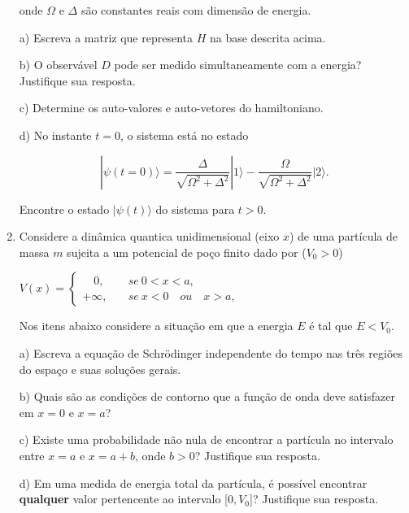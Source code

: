 \begin{enumerate}[start=1,label={\bfseries Q\arabic*.}]
onde $\Omega$ e $\Delta$ são constantes reais com dimensão de energia.


a) Escreva a matriz que representa $H$ na base descrita acima.

\resposta

b) O observável $D$ pode ser medido simultaneamente com a energia? Justifique sua resposta.

\resposta

c) Determine os auto-valores e auto-vetores do hamiltoniano.

\resposta

d) No instante $t = 0$, o sistema está no estado

$$
| \psi(t = 0) \rangle = \frac{\Delta}{\sqrt{\Omega^{2} + \Delta^{2}}} |1\rangle -\frac{\Omega}{\sqrt{\Omega^{2} + \Delta^{2}}} |2\rangle.
$$

Encontre o estado $| \psi(t) \rangle$ do sistema para $t > 0$.

\resposta




\item Considere a dinâmica quantica unidimensional (eixo $x$) de uma partícula de massa $m$ sujeita a um potencial de poço finito dado por ($V_{0} > 0$)


\begin{center}
$V(x) = \left\{\begin{array}{cc} \quad 0,& \quad se \ 0 < x < a, \\ +\infty,& \quad se \ x < 0 \quad ou \quad x > a, \end{array}\right.$
\end{center}


Nos itens abaixo considere a situação em que a energia $E$ é tal que $E < V_{0}$.



a) Escreva a equação de Schrödinger independente do tempo nas três regiões do espaço e suas soluções gerais.

\resposta

b) Quais são as condições de contorno que a função de onda deve satisfazer em $x = 0$ e $x = a$?

\resposta

c) Existe uma probabilidade não nula de encontrar a partícula no intervalo entre $x = a$ e $x = a + b$, onde $b > 0$? Justifique sua resposta.

\resposta

d) Em uma medida de energia total da partícula, é possível encontrar \textbf{qualquer} valor pertencente ao intervalo [$0, V_{0}$]? Justifique sua resposta.


\end{enumerate}
